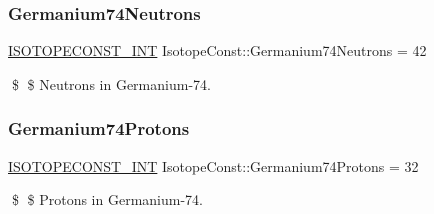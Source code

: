 \subsubsection{\texorpdfstring{Germanium74\+Neutrons}{Germanium74Neutrons}}
{\footnotesize\ttfamily \mbox{\hyperlink{group___isotope_const-_macros_ga5f18360b3e99483a35c32d789e62621c}{I\+S\+O\+T\+O\+P\+E\+C\+O\+N\+S\+T\+\_\+\+I\+NT}} Isotope\+Const\+::\+Germanium74\+Neutrons = 42}

\$ \$ Neutrons in Germanium-\/74. \mbox{\label{group___isotope_const-_germanium-_ge74_ga87eb6eee19cd7de86d616b65b15bd222}} 
\subsubsection{\texorpdfstring{Germanium74\+Protons}{Germanium74Protons}}
{\footnotesize\ttfamily \mbox{\hyperlink{group___isotope_const-_macros_ga5f18360b3e99483a35c32d789e62621c}{I\+S\+O\+T\+O\+P\+E\+C\+O\+N\+S\+T\+\_\+\+I\+NT}} Isotope\+Const\+::\+Germanium74\+Protons = 32}

\$ \$ Protons in Germanium-\/74. 